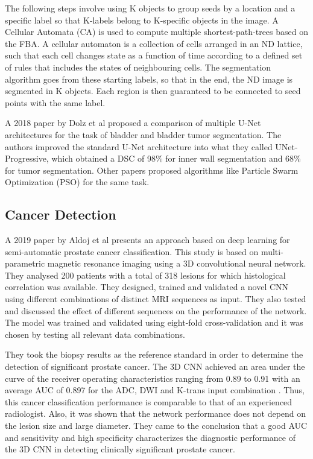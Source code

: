 \documentclass[runningheads,a4paper,11pt]{report}
\begin{document}
The following steps involve using K objects to group seeds by a location and a specific label so that K-labels belong to K-specific objects in the image. A Cellular Automata (CA) is used to compute multiple shortest-path-trees based on the FBA. A cellular automaton is a collection of cells arranged in an ND lattice, such that each cell changes state as a function of time according to a defined set of rules that includes the states of neighbouring cells. The segmentation algorithm goes from these starting labels, so that in the end, the ND image is segmented in K objects. Each region is then guaranteed to be connected to seed points with the same label.

A 2018 paper by Dolz et al \cite{dolz2018multiregion} proposed a comparison of multiple U-Net architectures for the task of bladder and bladder tumor segmentation. The authors improved the standard U-Net architecture into what they called UNet-Progressive, which obtained a DSC of 98\% for inner wall segmentation and 68\% for tumor segmentation. Other papers proposed algorithms like Particle Swarm Optimization (PSO) \cite{zhu2018shape} for the same task.

\subsection{Cancer Detection}

A 2019 paper by Aldoj et al \cite{aldoj2020semi} presents an approach based on deep learning for semi-automatic prostate cancer classification. This study is based on multi-parametric magnetic resonance imaging using a 3D convolutional neural network. They analysed 200 patients with a total of 318 lesions for which histological correlation was available. \cite{aldoj2020semi} They designed, trained and validated a novel CNN using different combinations of distinct MRI sequences as input. They also tested and discussed the effect of different sequences on the performance of the network. The model was trained and validated using eight-fold cross-validation and it was chosen by testing all relevant data combinations. 

They took the biopsy results as the reference standard in order to determine the detection of significant prostate cancer. The 3D CNN achieved an area under the curve of the receiver operating characteristics ranging from 0.89 to 0.91 with an average AUC of 0.897 for the ADC, DWI and  K-trans input combination \cite{aldoj2020semi}. Thus, this cancer classification performance is comparable to that of an experienced radiologist. Also, it was shown that the network performance does not depend on the lesion size and large diameter. They came to the conclusion that a good AUC and sensitivity and high specificity characterizes the diagnostic performance of the 3D CNN in detecting clinically significant prostate cancer. 
\end{document}
